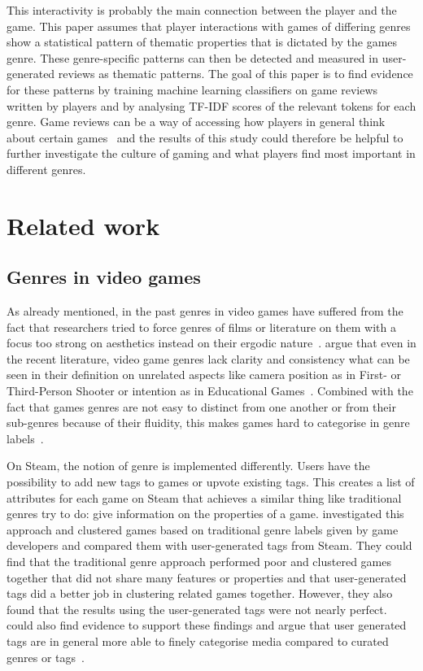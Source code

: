\documentclass[11pt, a4paper]{article}
\begin{document}
This interactivity is probably the main connection between the player and the game.
This paper assumes that player interactions with games of differing genres show a statistical pattern of thematic
properties that is dictated by the games genre.
These genre-specific patterns can then be detected and measured in user-generated reviews as thematic patterns.
The goal of this paper is to find evidence for these patterns by training machine learning classifiers on game
reviews written by players and by analysing TF-IDF scores of the relevant tokens for each genre.
Game reviews can be a way of accessing how players in general think about certain games~\parencite[358]{Zagal2011} and the
results of this study could therefore be helpful to further investigate the culture of gaming and what players find most
important in different genres.


\section{Related work}\label{sec:related-work}
\subsection{Genres in video games}\label{subsec:genres-in-video-games}
As already mentioned, in the past genres in video games have suffered from the fact that researchers tried to force
genres of films or literature on them with a focus too strong on aesthetics instead on their ergodic nature~\parencite[7]{Apperley2006}.
\cite{Heintz2015} argue that even in the recent literature, video game genres lack clarity and consistency what can
be seen in their definition on unrelated aspects like camera position as in First- or Third-Person Shooter or intention
as in Educational Games~\parencite[176-177]{Heintz2015}.
Combined with the fact that games genres are not easy to distinct from one another or from their sub-genres because
of their fluidity, this makes games hard to categorise in genre labels~\parencites[177]{Heintz2015}[23]{Atkins2003}.

On Steam, the notion of genre is implemented differently.
Users have the possibility to add new tags to games or upvote existing tags.
This creates a list of attributes for each game on Steam that achieves a similar thing like traditional genres try to do:
give information on the properties of a game.
\cite{Simonson2023} investigated this approach and clustered games based on traditional genre labels given by game
developers and compared them with user-generated tags from Steam.
They could find that the traditional genre approach performed poor and clustered games together that did not share many features or
properties and that user-generated tags did a better job in clustering related games together.
However, they also found that the results using the user-generated tags were not nearly perfect.
\cite{Windleharth2016} could also find evidence to support these findings and argue that user generated tags are in
general more able to finely categorise media compared to curated genres or tags~\parencite[421]{Windleharth2016}.
\end{document}
